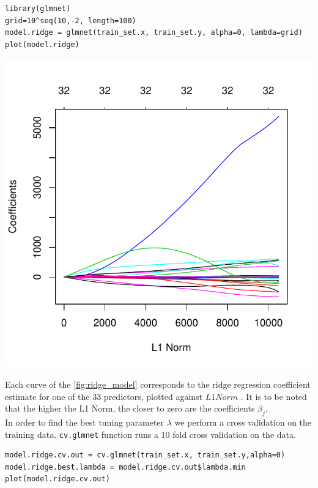 \documentclass[]{report}
\begin{document}
\begin{lstlisting}
library(glmnet)
grid=10^seq(10,-2, length=100)
model.ridge = glmnet(train_set.x, train_set.y, alpha=0, lambda=grid)
plot(model.ridge)
\end{lstlisting}

\begin{center}
	\includegraphics[width=0.8\linewidth]{Figures/ridge_model.pdf}
	\label{fig:ridge_model}
\end{center}

Each curve of the \ref{fig:ridge_model} corresponds to the ridge regression coefficient estimate for one of the 33 predictors, plotted against $L1 Norm$ . It is to be noted that the higher the L1 Norm, the closer to zero are the coefficients $\beta_{j}$.\\


In order to find the best tuning parameter $\lambda$ we perform a cross validation on the training data. \texttt{cv.glmnet} function runs a 10 fold cross validation on the data.

\begin{lstlisting}
model.ridge.cv.out = cv.glmnet(train_set.x, train_set.y,alpha=0)
model.ridge.best.lambda = model.ridge.cv.out$lambda.min
plot(model.ridge.cv.out)
\end{lstlisting}
\end{document}
